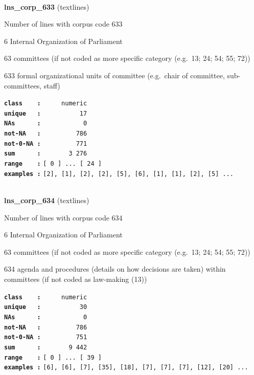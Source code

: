 \documentclass[]{article}
\begin{document}
~

\textbf{lns\_corp\_633} (textlines)

Number of lines with corpus code 633

6 Internal Organization of Parliament

63 committees (if not coded as more specific category (e.g.~13; 24; 54;
55; 72))

633 formal organizational units of committee (e.g.~chair of committee,
sub-committees, staff)

\textbf{\texttt{class\ \ \ \ :}} \texttt{~~~~~numeric}\\
\textbf{\texttt{unique\ \ \ :}} \texttt{~~~~~~~~~~17}\\
\textbf{\texttt{NAs\ \ \ \ \ \ :}} \texttt{~~~~~~~~~~~0}\\
\textbf{\texttt{not-NA\ \ \ :}} \texttt{~~~~~~~~~786}\\
\textbf{\texttt{not-0-NA\ :}} \texttt{~~~~~~~~~771}\\
\textbf{\texttt{sum\ \ \ \ \ \ :}} \texttt{~~~~~~~3~276}\\
\textbf{\texttt{range\ \ \ \ :}}
\texttt{{[}\ 0\ {]}\ ...\ {[}\ 24\ {]}}\\
\textbf{\texttt{examples\ :}}
\texttt{{[}2{]},\ {[}1{]},\ {[}2{]},\ {[}2{]},\ {[}5{]},\ {[}6{]},\ {[}1{]},\ {[}1{]},\ {[}2{]},\ {[}5{]}\ ...}\\

~

\textbf{lns\_corp\_634} (textlines)

Number of lines with corpus code 634

6 Internal Organization of Parliament

63 committees (if not coded as more specific category (e.g.~13; 24; 54;
55; 72))

634 agenda and procedures (details on how decisions are taken) within
committees (if not coded as law-making (13))

\textbf{\texttt{class\ \ \ \ :}} \texttt{~~~~~numeric}\\
\textbf{\texttt{unique\ \ \ :}} \texttt{~~~~~~~~~~30}\\
\textbf{\texttt{NAs\ \ \ \ \ \ :}} \texttt{~~~~~~~~~~~0}\\
\textbf{\texttt{not-NA\ \ \ :}} \texttt{~~~~~~~~~786}\\
\textbf{\texttt{not-0-NA\ :}} \texttt{~~~~~~~~~751}\\
\textbf{\texttt{sum\ \ \ \ \ \ :}} \texttt{~~~~~~~9~442}\\
\textbf{\texttt{range\ \ \ \ :}}
\texttt{{[}\ 0\ {]}\ ...\ {[}\ 39\ {]}}\\
\textbf{\texttt{examples\ :}}
\texttt{{[}6{]},\ {[}6{]},\ {[}7{]},\ {[}35{]},\ {[}18{]},\ {[}7{]},\ {[}7{]},\ {[}7{]},\ {[}12{]},\ {[}20{]}\ ...}\\
\end{document}

